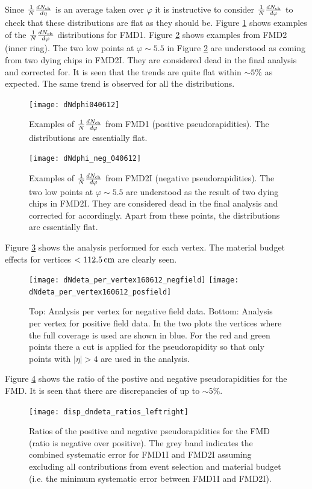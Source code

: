 \documentclass[11pt]{article}
\def\AlwaysText#1{\ifmmode\relax\text{#1}\else #1\fi}
\newcommand{\mult}[1][]{\ensuremath N_{\text{ch}#1}}
\newcommand{\dndeta}[1][]{{\ensuremath%
    \ifx|#1|\else\left.\fi%
    \frac{1}{N}\frac{d\mult{}}{d\eta}%
    \ifx|#1|\else\right|_{#1}\fi%
}}
\newcommand{\dndphi}[1][]{{\ensuremath%
    \ifx|#1|\else\left.\fi%
    \frac{1}{N}\frac{d\mult{}}{d\varphi}%
    \ifx|#1|\else\right|_{#1}\fi%
}}
\newcommand{\cm}[1]{\unit[#1]{\AlwaysText{cm}}}
\begin{document}
Since $\dndeta$ is an average taken over $\varphi$ it is instructive to
consider $\dndphi$ to check that these distributions are flat as they
should be. Figure \ref{dndphi_pos} shows examples of the $\dndphi$
distributions for FMD1. Figure \ref{dndphi_neg} shows examples from
FMD2 (inner ring). The two low points at $\varphi \sim 5.5$ in
Figure \ref{dndphi_neg} are
understood as coming from two dying chips in FMD2I. They are considered dead
in the final analysis and corrected for. It is seen that the trends
are quite flat within $\sim 5\%$
as expected. The same trend is observed for all the distributions. 
\begin{figure}
  \centering
  \texttt{[image: dNdphi040612]}
  \caption{Examples of $\dndphi$ from FMD1 (positive
    pseudorapidities). The distributions are essentially flat.}
  \label{dndphi_pos}
\end{figure} 
\begin{figure}
  \centering
  \texttt{[image: dNdphi\_neg\_040612]}
  \caption{Examples of $\dndphi$ from FMD2I (negative
    pseudorapidities). The two low points at $\varphi \sim 5.5$ are
    understood as the result of two dying chips in FMD2I. They are considered dead
    in the final analysis and corrected for accordingly. Apart from
    these points, the distributions are essentially flat.}
  \label{dndphi_neg}
\end{figure} 
Figure \ref{pervertex} shows the analysis performed for each
vertex. The material budget effects for vertices $<\cm{112.5}$ are
clearly seen. 
\begin{figure}
  
  \centering
  \texttt{[image: dNdeta\_per\_vertex160612\_negfield]}
  \centering
  \texttt{[image: dNdeta\_per\_vertex160612\_posfield]}
\caption{Top: Analysis per vertex for negative field data. Bottom:
  Analysis per vertex for positive field data. In the two plots the
  vertices where the full coverage is used are shown in blue. For the
  red and green points there a cut is applied for the pseudorapidity
  so that only points with $|\eta|>4$ are used in the analysis.}
\label{pervertex}
\end{figure} 
Figure \ref{leftright} shows the ratio of the postive and negative pseudorapidities for the FMD. It is seen that there are discrepancies of up to $\sim 5 \%$. 
\begin{figure}
  \centering
  \texttt{[image: disp\_dndeta\_ratios\_leftright]}
  \caption{Ratios of the positive and negative pseudorapidities for the FMD (ratio is negative over positive). The grey band indicates the combined systematic error for FMD1I and FMD2I assuming excluding all contributions from event selection and material budget (i.e. the minimum systematic error between FMD1I and FMD2I).}  \label{leftright}
\end{figure} 
\end{document}
